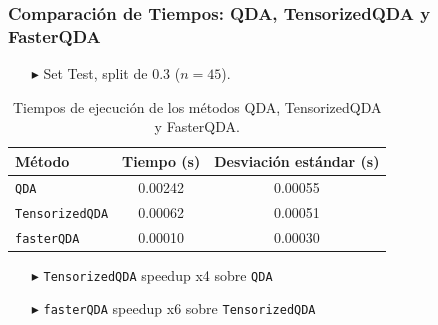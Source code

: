 \begin{frame}
  \frametitle{Comparación de Tiempos: QDA, TensorizedQDA y FasterQDA}

  \begin{itemize}
    \item[$\blacktriangleright$] Set Test, split de 0.3 ($n=45$).
  \end{itemize}

  \begin{table}[h!]
      \centering
      \begin{tabular}{@{}lcc@{}}
        \toprule
        \textbf{Método}      & Tiempo (s)           & Desviación estándar (s) \\ 
        \midrule
        \texttt{QDA}         & 0.00242              & 0.00055                 \\ 
        \texttt{TensorizedQDA} & 0.00062            & 0.00051                 \\ 
        \texttt{fasterQDA}   & 0.00010              & 0.00030                 \\ 
        \bottomrule
      \end{tabular}
      \caption{Tiempos de ejecución de los métodos QDA, TensorizedQDA y FasterQDA.}
  \end{table}


  \begin{itemize}
    \item[$\blacktriangleright$] \texttt{TensorizedQDA} speedup x4  sobre \texttt{QDA} 
    \item[$\blacktriangleright$] \texttt{fasterQDA} speedup x6  sobre \texttt{TensorizedQDA}
  \end{itemize}

\end{frame}


